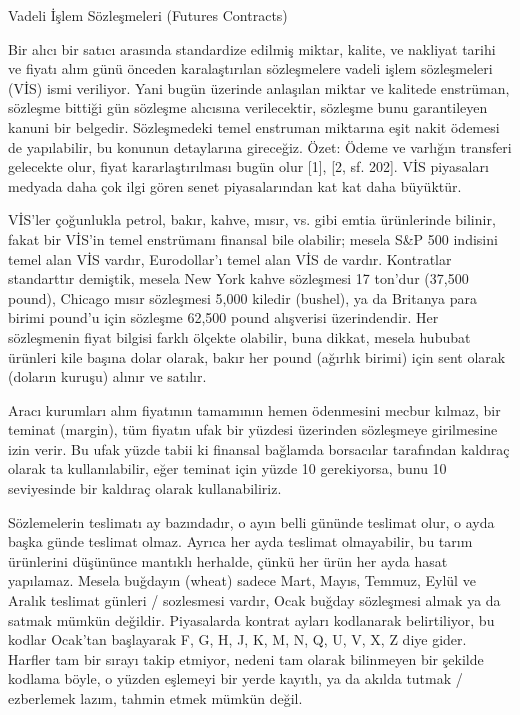 \documentclass[12pt,fleqn]{article}\usepackage{../../common}
\begin{document}
Vadeli İşlem Sözleşmeleri (Futures Contracts)

Bir alıcı bir satıcı arasında standardize edilmiş miktar, kalite, ve nakliyat
tarihi ve fiyatı alım günü önceden karalaştırılan sözleşmelere vadeli işlem
sözleşmeleri (VİS) ismi veriliyor. Yani bugün üzerinde anlaşılan miktar ve
kalitede enstrüman, sözleşme bittiği gün sözleşme alıcısına verilecektir,
sözleşme bunu garantileyen kanuni bir belgedir. Sözleşmedeki temel enstruman
miktarına eşit nakit ödemesi de yapılabilir, bu konunun detaylarına
gireceğiz. Özet: Ödeme ve varlığın transferi gelecekte olur, fiyat
kararlaştırılması bugün olur [1], [2, sf. 202]. VİS piyasaları medyada daha çok
ilgi gören senet piyasalarından kat kat daha büyüktür.

VİS'ler çoğunlukla petrol, bakır, kahve, mısır, vs. gibi emtia ürünlerinde
bilinir, fakat bir VİS'in temel enstrümanı finansal bile olabilir; mesela S\&P
500 indisini temel alan VİS vardır, Eurodollar'ı temel alan VİS de
vardır. Kontratlar standarttır demiştik, mesela New York kahve sözleşmesi 17
ton'dur (37,500 pound), Chicago mısır sözleşmesi 5,000 kiledir (bushel), ya da
Britanya para birimi pound'u için sözleşme 62,500 pound alışverisi
üzerindendir. Her sözleşmenin fiyat bilgisi farklı ölçekte olabilir, buna
dikkat, mesela hububat ürünleri kile başına dolar olarak, bakır her pound
(ağırlık birimi) için sent olarak (doların kuruşu) alınır ve satılır.

Aracı kurumları alım fiyatının tamamının hemen ödenmesini mecbur kılmaz, bir
teminat (margin), tüm fiyatın ufak bir yüzdesi üzerinden sözleşmeye girilmesine
izin verir. Bu ufak yüzde tabii ki finansal bağlamda borsacılar tarafından
kaldıraç olarak ta kullanılabilir, eğer teminat için yüzde 10 gerekiyorsa, bunu
10 seviyesinde bir kaldıraç olarak kullanabiliriz.

Sözlemelerin teslimatı ay bazındadır, o ayın belli gününde teslimat olur, o ayda
başka günde teslimat olmaz. Ayrıca her ayda teslimat olmayabilir, bu tarım
ürünlerini düşününce mantıklı herhalde, çünkü her ürün her ayda hasat
yapılamaz. Mesela buğdayın (wheat) sadece Mart, Mayıs, Temmuz, Eylül ve Aralık
teslimat günleri / sozlesmesi vardır, Ocak buğday sözleşmesi almak ya da satmak
mümkün değildir. Piyasalarda kontrat ayları kodlanarak belirtiliyor, bu kodlar
Ocak'tan başlayarak F, G, H, J, K, M, N, Q, U, V, X, Z diye gider. Harfler tam
bir sırayı takip etmiyor, nedeni tam olarak bilinmeyen bir şekilde kodlama
böyle, o yüzden eşlemeyi bir yerde kayıtlı, ya da akılda tutmak / ezberlemek
lazım, tahmin etmek mümkün değil.
\end{document}

